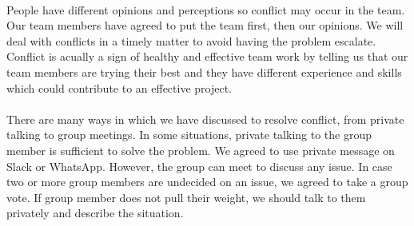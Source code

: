 \documentclass[11pt, a4paper]{article}
\begin{document}
\paragraph{}
People have different opinions and perceptions so conflict may occur in the team. Our team members have agreed to put the team first, then our opinions. We will deal with conflicts in a timely matter to avoid having the problem escalate. Conflict is acually a sign of healthy and effective team work by telling us that our team members are trying their best and they have different experience and skills which could contribute to an effective project.
\paragraph{}
There are many ways in which we have discussed to resolve conflict, from private talking to group meetings. In some situations, private talking to the group member is sufficient to solve the problem. We agreed to use private message on Slack or WhatsApp. However, the group can meet to discuss any issue. In case two or more group members are undecided on an issue, we agreed to take a group vote. If group member does not pull their weight, we should talk to them privately and describe the situation.
\end{document}
